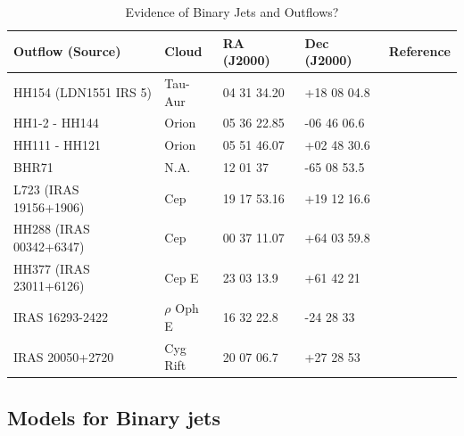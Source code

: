 \begin{table}
\begin{center}
\caption{Evidence of Binary Jets and Outflows?}
\label{BinaryOutflowTable}
\begin{tabular}{l l l l l}
\hline
\hline
Outflow (Source)  & Cloud & RA (J2000) & Dec (J2000) & Reference \\
\hline
HH154 (LDN1551 IRS 5)        & Tau-Aur   &  04 31 34.20 & +18 08 04.8 & \citet{2005ApJ...L}\\
HH1-2 - HH144     &  Orion & 05 36 22.85 & -06 46 06.6   & \citet{1993ApJ...408L..49R} \\
HH111 - HH121     & Orion &  05 51 46.07 & +02 48 30.6  & \citet{1994AA...289L..19G} \\
BHR71             & N.A.  &  12 01 37    & -65 08 53.5  & \citet{2006AA...454L..79P} \\
L723 (IRAS 19156+1906)  & Cep & 19 17 53.16 & +19 12 16.6 & \citet{2004RMxAC..21..100A} \\
HH288 (IRAS 00342+6347) & Cep& 00 37 11.07 & +64 03 59.8 & \citet{2001AA...375.1018G} \\
HH377 (IRAS 23011+6126) & Cep E  & 23 03  13.9 & +61 42 21  & \citet{1997ApJ...474..749L} \\
IRAS 16293-2422 & $\rho$ Oph E   & 16 32 22.8 & -24 28 33  & \citet{2001ApJ...547..899H} \\
IRAS 20050+2720 & Cyg Rift    & 20 07 06.7 & +27 28 53 &  \citet{1995ApJ...445L..51B}  \\
\hline
\end{tabular}
\end{center}
\end{table}



\subsection{Models for Binary jets}

